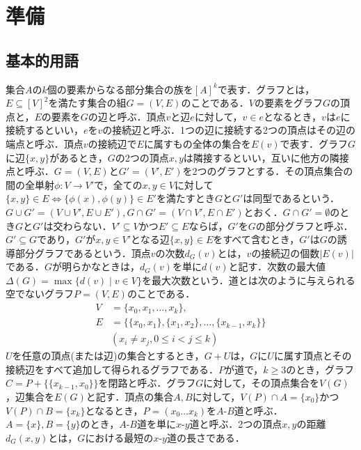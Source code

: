 \section{準備}

\subsection{基本的用語}
集合$A$の$k$個の要素からなる部分集合の族を$[A]^k$で表す．グラフとは，$E\subseteq [V]^2$を満たす集合の組$G=(V,E)$のことである．$V$の要素をグラフ$G$の頂点と，$E$の要素を$G$の辺と呼ぶ．頂点$v$と辺$e$に対して，$v\in e$となるとき，$v$は$e$に接続するといい，$e$を$v$の接続辺と呼ぶ．1つの辺に接続する2つの頂点はその辺の端点と呼ぶ．頂点$v$の接続辺で$E$に属すもの全体の集合を$E(v)$で表す．グラフ$G$に辺$\{x,y\}$があるとき，$G$の2つの頂点$x,y$は隣接するといい，互いに他方の隣接点と呼ぶ．$G=(V,E)$と$G'=(V',E')$を2つのグラフとする．その頂点集合の間の全単射$\phi :V\rightarrow V'$で，全ての$x,y\in V$に対して$\{x,y\}\in E\Leftrightarrow \{\phi(x),\phi(y)\}\in E'$を満たすとき$G$と$G'$は同型であるという．$G\cup G'= (V\cup V',E\cup E'),G\cap G'= (V\cap V',E\cap E')$とおく．$G\cap G'=\emptyset$のとき$G$と$G'$は交わらない．$V'\subseteq V$かつ$E'\subseteq E$ならば，$G'$を$G$の部分グラフと呼ぶ．$G'\subseteq G$であり，$G'$が$x,y\in V'$となる辺$\{x,y\}\in E$をすべて含むとき，$G'$は$G$の誘導部分グラフであるという．頂点$v$の次数$d_G(v)$とは，$v$の接続辺の個数$|E(v)|$である．$G$が明らかなときは，$d_G(v)$を単に$d(v)$と記す．次数の最大値$\Delta (G)= \max \{d(v)\mid v\in V\}$を最大次数という．道とは次のように与えられる空でないグラフ$P=(V,E)$のことである．
\begin{align*}
  V & = \{x_0,x_1,\ldots,x_k\},\\
  E & = \{\{x_0,x_1\},\{x_1,x_2\},\ldots,\{x_{k-1},x_k\}\}\\
    & (x_i\neq x_j,0\leq i<j\leq k)
\end{align*}
$U$を任意の頂点(または辺)の集合とするとき，$G+U$は，$G$に$U$に属す頂点とその接続辺をすべて追加して得られるグラフである．$P$が道で，$k\geq 3$のとき，グラフ$C=P+\{\{x_{k-1},x_0\}\}$を閉路と呼ぶ．グラフ$G$に対して，その頂点集合を$V(G)$，辺集合を$E(G)$と記す．頂点の集合$A,B$に対して，$V(P)\cap A=\{x_0\}$かつ$V(P)\cap B=\{x_k\}$となるとき，$P=(x_0\ldots x_k)$を$A$-$B$道と呼ぶ．$A=\{x\},B=\{y\}$のとき，$A$-$B$道を単に$x$-$y$道と呼ぶ．2つの頂点$x,y$の距離$d_G(x,y)$とは，$G$における最短の$x$-$y$道の長さである．

